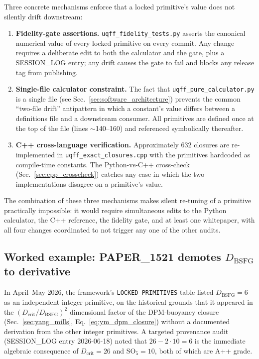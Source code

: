 Three concrete mechanisms enforce that a locked primitive's value
does not silently drift downstream:

\begin{enumerate}
  \item \textbf{Fidelity-gate assertions.} \texttt{uqff\_fidelity\_tests.py}
        asserts the canonical numerical value of every locked
        primitive on every commit. Any change requires a deliberate
        edit to both the calculator and the gate, plus a SESSION\_LOG
        entry; any drift causes the gate to fail and blocks any
        release tag from publishing.
  \item \textbf{Single-file calculator constraint.} The fact that
        \texttt{uqff\_pure\_calculator.py} is a single file (see
        Sec.~\ref{sec:software_architecture}) prevents the common
        ``two-file drift'' antipattern in which a constant's value
        differs between a definitions file and a downstream consumer.
        All primitives are defined once at the top of the file (lines
        $\sim$140--160) and referenced symbolically thereafter.
  \item \textbf{C++ cross-language verification.} Approximately 632
        closures are re-implemented in \texttt{uqff\_exact\_closures.cpp}
        with the primitives hardcoded as compile-time constants. The
        Python-vs-C++ cross-check (Sec.~\ref{sec:cpp_crosscheck})
        catches any case in which the two implementations disagree
        on a primitive's value.
\end{enumerate}

The combination of these three mechanisms makes silent re-tuning of
a primitive practically impossible: it would require simultaneous
edits to the Python calculator, the C++ reference, the fidelity
gate, and at least one whitepaper, with all four changes coordinated
to not trigger any one of the other audits.

\subsection{Worked example: PAPER\_1521 demotes $D_{\text{BSFG}}$ to derivative}
\label{sec:paper_1521_worked}

In April--May 2026, the framework's \texttt{LOCKED\_PRIMITIVES} table
listed $D_{\text{BSFG}} = 6$ as an independent integer primitive,
on the historical grounds that it appeared in the
$(D_{\text{crit}}/D_{\text{BSFG}})^2$ dimensional factor of the
DPM-buoyancy closure (Sec.~\ref{sec:yang_mills},
Eq.~\ref{eq:ym_dpm_closure}) without a documented derivation from
the other integer primitives. A targeted provenance audit
(SESSION\_LOG entry 2026-06-18) noted that
$26 - 2 \cdot 10 = 6$ is the immediate algebraic consequence of
$D_{\text{crit}} = 26$ and $\mathrm{SO}_5 = 10$, both of which are
A++ grade.

